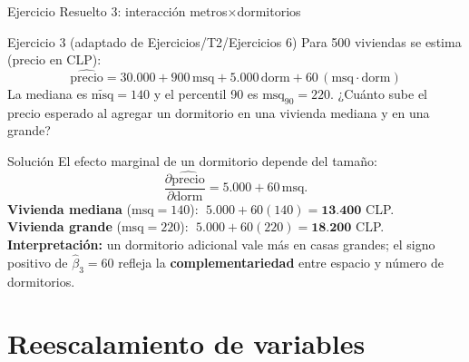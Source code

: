\documentclass{beamer}
\begin{document}
\begin{frame}{Ejercicio Resuelto 3: interacción metros$\times$dormitorios}

\begin{block}{Ejercicio 3 (adaptado de Ejercicios/T2/Ejercicios 6)}
Para 500 viviendas se estima (precio en CLP):
\[
\widehat{\text{precio}} = 30{.}000 + 900\,\text{msq} + 5{.}000\,\text{dorm} + 60\,(\text{msq}\cdot\text{dorm})
\]
La mediana es $\widetilde{\text{msq}}=140$ y el percentil 90 es $\text{msq}_{90}=220$. ¿Cuánto sube el precio esperado al agregar un dormitorio en una vivienda mediana y en una grande?
\end{block}

\pause

\begin{exampleblock}{Solución}
El efecto marginal de un dormitorio depende del tamaño:
\[
\frac{\partial \widehat{\text{precio}}}{\partial \text{dorm}} = 5{.}000 + 60\,\text{msq}.
\]
\textbf{Vivienda mediana} ($\text{msq}=140$): $\;5{.}000 + 60(140) = \mathbf{13{.}400}$ CLP.\\
\textbf{Vivienda grande} ($\text{msq}=220$): $\;5{.}000 + 60(220) = \mathbf{18{.}200}$ CLP.\\[4pt]
\textbf{Interpretación:} un dormitorio adicional vale más en casas grandes; el signo positivo de $\hat\beta_3=60$ refleja la \textbf{complementariedad} entre espacio y número de dormitorios.
\end{exampleblock}

\end{frame}

\section{Reescalamiento de variables}
\end{document}
